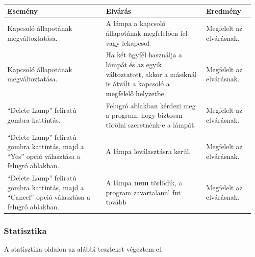 \documentclass[a4paper,12pt]{report}
\begin{document}
    \begin{center}
        \begin{tabular}{ | m{4.5cm} | m{4.5cm} | m{4.5cm} |}
            \hline
            Esemény & Elvárás & Eredmény \\ \hline
            Kapcsoló állapotának megváltoztatása. & A lámpa a kapcsoló állapotának megfelelően fel- vagy lekapcsol. & Megfelelt az elvárásnak. \\ \hline
            Kapcsoló állapotának megváltoztatása. & Ha két ügyfél használja a lámpát és az egyik változtatott, akkor a másiknál is átvált a kapcsoló a megfelelő
            helyzetbe. & Megfelelt az elvárásnak.\\ \hline
            ``Delete Lamp'' feliratú gombra kattintás. & Felugró ablakban kérdezi meg a program, hogy biztosan törölni szeretnénk-e a lámpát. & Megfelelt az elvárásnak. \\ \hline
            ``Delete Lamp'' feliratú gombra kattintás, majd a ``Yes'' opció választása a felugró ablakban. & A lámpa leválasztásra kerül. & Megfelelt az elvárásnak. \\ \hline
            ``Delete Lamp'' feliratú gombra kattintás, majd a ``Cancel'' opció választása a felugró ablakban. & A lámpa \textbf{nem} törlődik, a program zavartalanul fut tovább
            & Megfelelt az elvárásnak. \\
            \hline
        \end{tabular}
    \end{center}

    \subsubsection{Statisztika}
    A statisztika oldalon az alábbi teszteket végeztem el:
\end{document}
